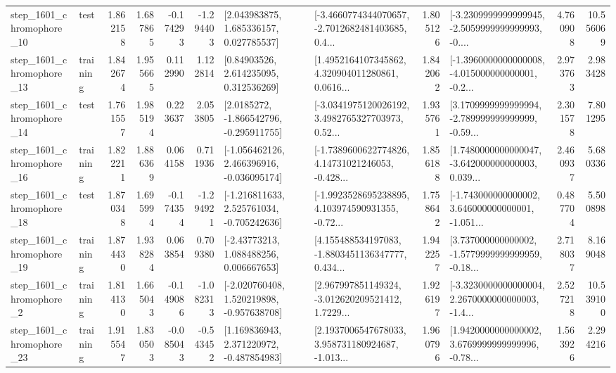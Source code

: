 \begin{tabular}{llrrrrllrlrr}
 step\_1601\_chromophore\_10 &      test &      1.862158 &    1.687865 &     -0.174293 & -1.294403 &     [2.043983875, 1.685336157, 0.027785537] &  [-3.4660774344070657, -2.7012682481403685, 0.4... &       1.805126 &  [-3.2309999999999945, -2.5059999999999993, -0.... &            4.760908 &         10.556069 \\
 step\_1601\_chromophore\_13 &  training &      1.842674 &    1.955665 &      0.112990 &  1.122814 &      [0.84903526, 2.614235095, 0.312536269] &  [1.4952164107345862, 4.320904011280861, 0.0616... &       1.842062 &  [-1.3960000000000008, -4.015000000000001, -0.2... &            2.973763 &          2.983428 \\
 step\_1601\_chromophore\_14 &      test &      1.761557 &    1.985194 &      0.223637 &  2.053805 &     [2.0185272, -1.866542796, -0.295911755] &  [-3.0341975120026192, 3.4982765327703973, 0.52... &       1.935761 &  [3.1709999999999994, -2.789999999999999, -0.59... &            2.301578 &          7.801295 \\
 step\_1601\_chromophore\_16 &  training &      1.822211 &    1.886369 &      0.064158 &  0.711936 &   [-1.056462126, 2.466396916, -0.036095174] &  [-1.7389600622774826, 4.14731021246053, -0.428... &       1.856188 &  [1.7480000000000047, -3.642000000000003, 0.039... &            2.460937 &          5.680336 \\
 step\_1601\_chromophore\_18 &      test &      1.870348 &    1.695994 &     -0.174354 & -1.294921 &   [-1.216811633, 2.525761034, -0.705242636] &  [-1.9923528695238895, 4.103974590931355, -0.72... &       1.758642 &  [-1.743000000000002, 3.646000000000001, -1.051... &            0.487704 &          5.500898 \\
 step\_1601\_chromophore\_19 &  training &      1.874430 &    1.938284 &      0.063854 &  0.709380 &     [-2.43773213, 1.088488256, 0.006667653] &  [4.155488534197083, -1.8803451136347777, 0.434... &       1.942257 &  [3.737000000000002, -1.5779999999999959, -0.18... &            2.718037 &          8.169048 \\
  step\_1601\_chromophore\_2 &  training &      1.814130 &    1.665043 &     -0.149086 & -1.082313 &   [-2.020760408, 1.520219898, -0.957638708] &  [2.967997851149324, -3.012620209521412, 1.7229... &       1.926197 &  [-3.3230000000000004, 2.2670000000000003, -1.4... &            2.527218 &         10.539100 \\
 step\_1601\_chromophore\_23 &  training &      1.915547 &    1.830503 &     -0.085043 & -0.543452 &    [1.169836943, 2.371220972, -0.487854983] &  [2.1937006547678033, 3.958731180924687, -1.013... &       1.960796 &  [1.9420000000000002, 3.6769999999999996, -0.78... &            1.563926 &          2.294216 \\

\end{tabular}
